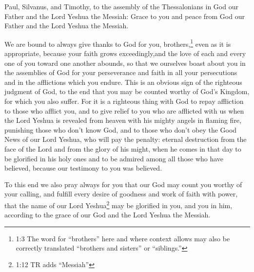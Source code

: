 





\vspace{-1.36in}


\mychapter{} \myverse*{}Paul, Silvanus, and Timothy, to the assembly of the Thessalonians in God our Father and the Lord Yeshua the Messiah: \myverse{}Grace to you and peace from God our Father and the Lord Yeshua the Messiah.


\myverse{}We are bound to always give thanks to God for you, brothers,\footnote{1:3 The word for “brothers” here and where context allows may also be correctly translated “brothers and sisters” or “siblings.”} even as it is appropriate, because your faith grows exceedingly,and the love of each and every one of you toward one another abounds, \myverse{}so that we ourselves boast about you in the assemblies of God for your perseverance and faith in all your persecutions and in the afflictions which you endure. \myverse{}This is an obvious sign of the righteous judgment of God, to the end that you may be counted worthy of God’s Kingdom, for which you also suffer. \myverse{}For it is a righteous thing with God to repay affliction to those who afflict you, \myverse{}and to give relief to you who are afflicted with us when the Lord Yeshua is revealed from heaven with his mighty angels in flaming fire, \myverse{}punishing those who don’t know God, and to those who don’t obey the Good News of our Lord Yeshua, \myverse{}who will pay the penalty: eternal destruction from the face of the Lord and from the glory of his might, \myverse{}when he comes in that day to be glorified in his holy ones and to be admired among all those who have believed, because our testimony to you was believed.


\myverse{}To this end we also pray always for you that our God may count you worthy of your calling, and fulfill every desire of goodness and work of faith with power, \myverse{}that the name of our Lord Yeshua\footnote{1:12 TR adds “Messiah”} may be glorified in you, and you in him, according to the grace of our God and the Lord Yeshua the Messiah.


